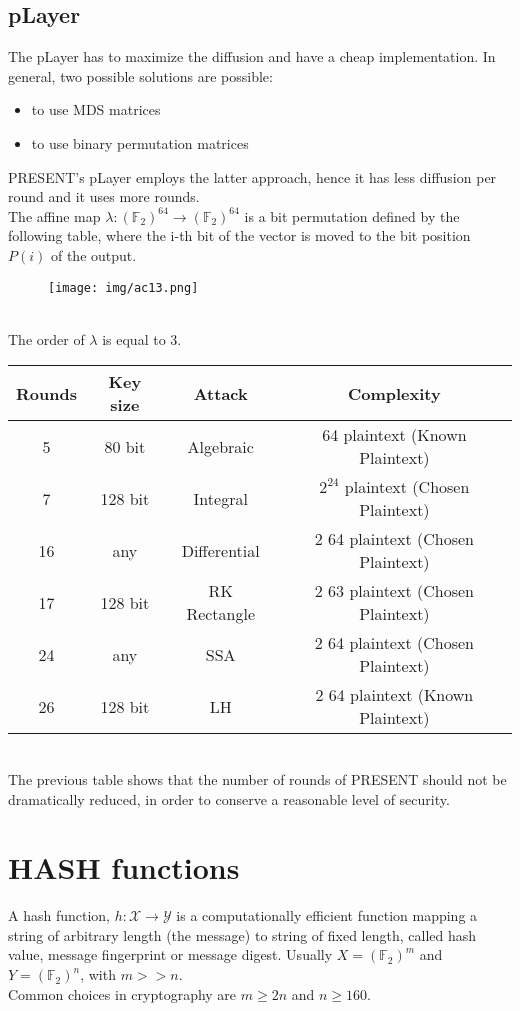 \documentclass[a4paper, 10pt, titlepage]{article}
\begin{document}
\subsection*{pLayer}
The pLayer has to maximize the diffusion and have a cheap implementation. In general, two possible solutions are possible:
\begin{itemize}
\item to use MDS matrices
\item to use binary permutation matrices
\end{itemize}
PRESENT’s pLayer employs the latter approach, hence it has less diffusion per round and it uses more rounds.\\
The affine map $\lambda: (\mathbb{F}_2)^{64} \rightarrow (\mathbb{F}_2)^{64}$ is a bit permutation defined by the following table, where the i-th bit of the vector is moved to the bit
position $P(i)$ of the output.
\begin{figure}[h]
\centering
\texttt{[image: img/ac13.png]}
\end{figure} \\
The order of $\lambda$ is equal to 3. \medskip \\
\begin{tabular}{|c|c|c|c|}\hline
Rounds & Key size &Attack & Complexity \\ \hline
5 & 80 bit &Algebraic & 64 plaintext (Known Plaintext) \\
7 & 128 bit &Integral & $2^{24}$ plaintext (Chosen Plaintext) \\
16 & any & Differential & 2 64 plaintext (Chosen Plaintext)\\
17 & 128 bit & RK Rectangle & 2 63 plaintext (Chosen Plaintext) \\
24 & any & SSA & 2 64 plaintext (Chosen Plaintext) \\
26 & 128 bit & LH & 2 64 plaintext (Known Plaintext) \\ \hline
\end{tabular} \medskip \\
The previous table shows that the number of rounds of PRESENT should not be dramatically reduced, in order to conserve a reasonable level of security.

\newpage
\section{HASH functions}
A hash function, $h : \mathcal{X} \rightarrow \mathcal{Y}$ is a computationally efficient function mapping a string of arbitrary length (the message) to string of fixed length, called hash value, message fingerprint or message digest. Usually $X = (\mathbb{F}_2)^m$ and $Y = (\mathbb{F}_2)^n$, with $m >> n$. \\
Common choices in cryptography are $m \geq 2n$ and $n \geq 160$. 
\end{document}
